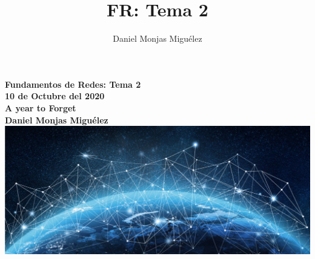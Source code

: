 \documentclass[a4paper,11pt]{article}
\author{Daniel Monjas Miguélez}
\title{FR: Tema 2}
\begin{document}
\begin{titlepage}
\centering
    \vfill
    {\bfseries\Large
        Fundamentos de Redes: Tema 2\\
        10 de Octubre del 2020\\
        A year to Forget \\
        \vskip2cm
        Daniel Monjas Miguélez\\
    }    
    \vfill
    \includegraphics[width=15cm]{redes.jpg}
    \vfill
    \vfill
\end{titlepage}

\newpage
\tableofcontents
\newpage
\end{document}

